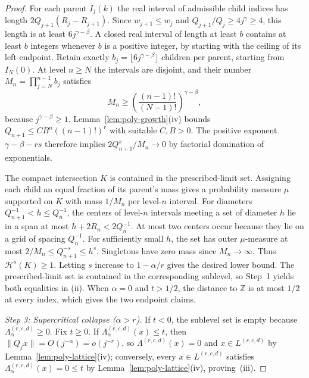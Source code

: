 \documentclass[11pt]{article}
\theoremstyle{definition}
\theoremstyle{remark}
\newcommand{\Z}{\mathbb{Z}}
\newcommand{\Lam}{\Lambda}
\begin{document}
\begin{proof}
For each parent $I_j(k)$ the real interval of admissible child indices
has length $2Q_{j+1}(R_j-R_{j+1})$. Since $w_{j+1}\le w_j$ and
$Q_{j+1}/Q_j\ge 4j^\gamma\ge4$, this length is at least
$6j^{\gamma-\beta}$. A closed real interval of length at least $b$
contains at least $b$ integers whenever $b$ is a positive integer,
by starting with the ceiling of its left endpoint. Retain exactly
$b_j=\lfloor 6j^{\gamma-\beta}\rfloor$ children per parent, starting from
$I_N(0)$. At level $n\ge N$ the intervals are disjoint, and their number
$M_n=\prod_{j=N}^{n-1} b_j$ satisfies
\[
 M_n\ge \left(\frac{(n-1)!}{(N-1)!}\right)^{\gamma-\beta},
\]
because $j^{\gamma-\beta}\ge1$. Lemma~\ref{lem:poly-growth}(iv) bounds
$Q_{n+1}\le C B^n ((n-1)!)^r$ with suitable $C,B>0$.
The positive exponent $\gamma-\beta-rs$ therefore implies
$2Q_{n+1}^s/M_n\to0$ by factorial domination of exponentials.

The compact intersection $K$ is contained in the prescribed-limit set.
Assigning each child an equal fraction of its parent's mass gives a
probability measure $\mu$ supported on $K$ with mass $1/M_n$ per level-$n$
interval. For diameters $Q_{n+1}^{-1}<h\le Q_n^{-1}$,
the centers of level-$n$ intervals meeting a set of diameter $h$ lie
in a span at most $h+2R_n<2Q_n^{-1}$. At most two centers occur because
they lie on a grid of spacing $Q_n^{-1}$. For sufficiently small $h$,
the set has outer $\mu$-measure at most $2/M_n\le Q_{n+1}^{-s}\le h^s$.
Singletons have zero mass since $M_n\to\infty$. Thus
$\mathcal H^s(K)\ge1$. Letting $s$ increase to $1-\alpha/r$ gives the
desired lower bound. The prescribed-limit set is contained in the
corresponding sublevel, so Step~1 yields both equalities in (ii).
When $\alpha=0$ and $t>1/2$, the distance to $\Z$ is at most $1/2$ at
every index, which gives the two endpoint claims.

\emph{Step 3: Supercritical collapse ($\alpha>r$).} If $t<0$, the sublevel set
is empty because $\Lam_\alpha^{(r,c,d)}\ge0$. Fix $t\ge0$. If
$\Lam_\alpha^{(r,c,d)}(x)\le t$, then $\|Q_jx\|=O(j^{-\alpha})=o(j^{-r})$, so
$\Lam^{(r,c,d)}(x)=0$ and $x\in L^{(r,c,d)}$ by Lemma~\ref{lem:poly-lattice}(iv);
conversely, every $x\in L^{(r,c,d)}$ satisfies $\Lam_\alpha^{(r,c,d)}(x)=0\le t$
by Lemma~\ref{lem:poly-lattice}(iv), proving~(iii).
\end{proof}
\end{document}
